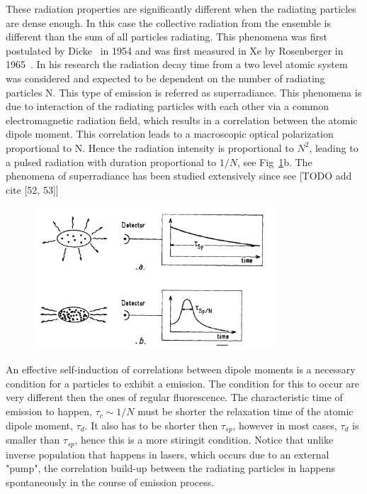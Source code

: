 These radiation properties are significantly different when the radiating particles are dense enough. In this case the collective radiation from  the ensemble is different than the sum of all particles radiating. This phenomena was first postulated by Dicke~\cite{DickeSR} in 1954 and was first measured in Xe by Rosenberger in 1965~\cite{FirstMeasure}. In his research the radiation decay time from a two level atomic system was considered and expected to be dependent on the number of radiating particles N. This type of emission is referred as superradiance. This phenomena is due to interaction of the radiating particles with each other via a common electromagnetic radiation field, which results in a correlation between the atomic dipole moment. This correlation leads to a macroscopic optical polarization proportional to N. Hence the radiation intensity is proportional to $N^2$, leading to a pulsed radiation with duration proportional to $1/N$, see Fig~\ref{fig:emissionType}b. The phenomena of superradiance has been studied extensively since see [TODO add cite [52, 53]]   
\begin{figure}[t!]
	\centering
	\includegraphics[width=0.8\textwidth]{figs/emissionTypes.png}
	\label{fig:emissionType}
\end{figure}


An effective self-induction of correlations between dipole moments is a necessary condition for a particles to exhibit a \superradiance emission. The condition for this to occur are very different then the ones of regular fluorescence. The characteristic time of \superradiance emission to happen, $\tau_c \sim 1/N $ must be shorter the relaxation time of the atomic dipole moment, $\tau_d$. It also has to be shorter then $\tau_{sp}$, however in most cases, $\tau_{d}$ is smaller than $\tau_{sp}$, hence this is a more stiringit condition. Notice that unlike inverse population that happens in lasers, which occurs due to an external "pump", the correlation build-up between the radiating particles in \superradiance happens spontaneously in the course of emission process.

